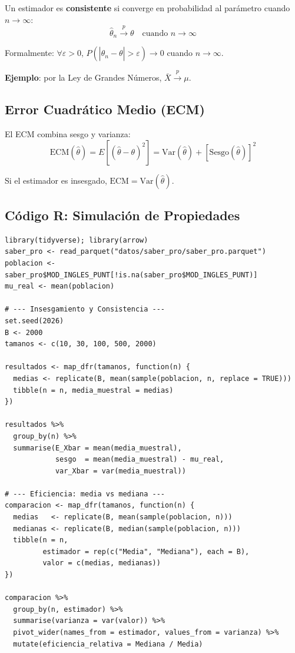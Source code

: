 \documentclass[11pt, a4paper]{article}
\begin{document}
Un estimador es \textbf{consistente} si converge en probabilidad al par\'ametro cuando $n \to \infty$:
\[
\hat{\theta}_n \xrightarrow{p} \theta \quad \text{cuando } n \to \infty
\]

Formalmente: $\forall \varepsilon > 0$, $P(|\hat{\theta}_n - \theta| > \varepsilon) \to 0$ cuando $n \to \infty$.

\textbf{Ejemplo}: por la Ley de Grandes N\'umeros, $\bar{X} \xrightarrow{p} \mu$.

\subsection{Error Cuadr\'atico Medio (ECM)}

El ECM combina sesgo y varianza:
\[
\text{ECM}(\hat{\theta}) = E\!\left[(\hat{\theta} - \theta)^2\right]
= \text{Var}(\hat{\theta}) + [\text{Sesgo}(\hat{\theta})]^2
\]

Si el estimador es insesgado, $\text{ECM} = \text{Var}(\hat{\theta})$.

\subsection{C\'odigo R: Simulaci\'on de Propiedades}

\begin{lstlisting}
library(tidyverse); library(arrow)
saber_pro <- read_parquet("datos/saber_pro/saber_pro.parquet")
poblacion <- saber_pro$MOD_INGLES_PUNT[!is.na(saber_pro$MOD_INGLES_PUNT)]
mu_real <- mean(poblacion)

# --- Insesgamiento y Consistencia ---
set.seed(2026)
B <- 2000
tamanos <- c(10, 30, 100, 500, 2000)

resultados <- map_dfr(tamanos, function(n) {
  medias <- replicate(B, mean(sample(poblacion, n, replace = TRUE)))
  tibble(n = n, media_muestral = medias)
})

resultados %>%
  group_by(n) %>%
  summarise(E_Xbar = mean(media_muestral),
            sesgo  = mean(media_muestral) - mu_real,
            var_Xbar = var(media_muestral))

# --- Eficiencia: media vs mediana ---
comparacion <- map_dfr(tamanos, function(n) {
  medias   <- replicate(B, mean(sample(poblacion, n)))
  medianas <- replicate(B, median(sample(poblacion, n)))
  tibble(n = n,
         estimador = rep(c("Media", "Mediana"), each = B),
         valor = c(medias, medianas))
})

comparacion %>%
  group_by(n, estimador) %>%
  summarise(varianza = var(valor)) %>%
  pivot_wider(names_from = estimador, values_from = varianza) %>%
  mutate(eficiencia_relativa = Mediana / Media)
\end{lstlisting}
\end{document}
